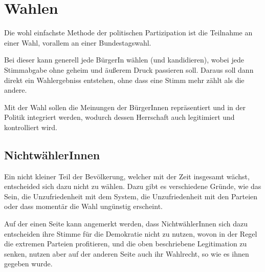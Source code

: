 \documentclass{article}
\begin{document}
\section{Wahlen}
Die wohl einfachste Methode der politischen Partizipation ist die Teilnahme an einer Wahl, vorallem an einer Bundestagswahl.
 
Bei dieser kann generell jede BürgerIn wählen (und kandidieren), wobei jede Stimmabgabe ohne geheim und äußerem Druck passieren soll. Daraus soll dann direkt ein Wahlergebniss entstehen, ohne dass eine Stimm mehr zählt als die andere.
 
Mit der Wahl sollen die Meinungen der BürgerInnen repräsentiert und in der Politik integriert werden, wodurch dessen Herrschaft auch legitimiert und kontrolliert wird.
 
\subsection{NichtwählerInnen}
Ein nicht kleiner Teil der Bevölkerung, welcher mit der Zeit insgesamt wächst, entscheided sich dazu nicht zu wählen. Dazu gibt es verschiedene Gründe, wie das  Sein, die Unzufriedenheit mit dem System, die Unzufriedenheit mit den Parteien oder dass momentär die Wahl ungünstig erscheint.
 
Auf der einen Seite kann angemerkt werden, dass NichtwählerInnen sich dazu entscheiden ihre Stimme für die Demokratie nicht zu nutzen, wovon in der Regel die extremen Parteien profitieren, und die oben beschriebene Legitimation zu senken, nutzen aber auf der anderen Seite auch ihr Wahlrecht, so wie es ihnen gegeben wurde.
\end{document}

